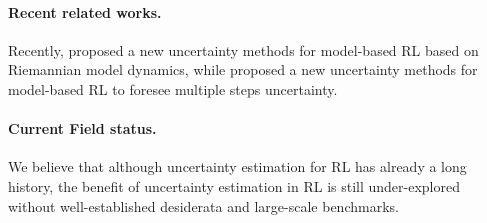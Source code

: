 \paragraph{Recent related works.} Recently, \cite{tennenholtz2022plan} proposed a new uncertainty methods for model-based RL based on Riemannian model dynamics, while \cite{wu2022plan} proposed a new uncertainty methods for model-based RL to foresee multiple steps uncertainty.

\paragraph{Current Field status.} We believe that although uncertainty estimation for RL has already a long history, the benefit of uncertainty estimation in RL is still under-explored without well-established desiderata and large-scale benchmarks.